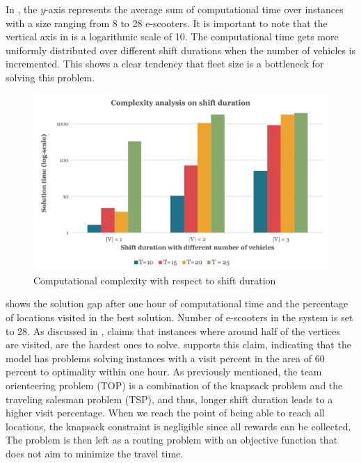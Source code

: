 In , the $y$-axis represents the average sum of computational time over instances with a size ranging from 8 to 28 e-scooters. It is important to note that the vertical axis in  is a logarithmic scale of 10. The computational time gets more uniformly distributed over different shift durations when the number of vehicles is incremented. This shows a clear tendency that fleet size is a bottleneck for solving this problem.
\\
\begin{figure}[H]
    \centering
    \includegraphics[width=0.8\columnwidth]{Images/Computational Study/sens_shift_dur.png}
    \caption{Computational complexity with respect to shift duration}
    \label{fig:size_solvable_sens_time}
\end{figure}
 shows the solution gap after one hour of computational time and the percentage of locations visited in the best solution. Number of e-scooters in the system is set to 28. As discussed in , \citet{vansteenwegen_iterated_2009} claims that instances where around half of the vertices are visited, are the hardest ones to solve.  supports this claim, indicating that the model has problems solving instances with a visit percent in the area of 60 percent to optimality within one hour. As previously mentioned, the team orienteering problem (TOP) is a combination of the knapsack problem and the traveling salesman problem (TSP), and thus, longer shift duration leads to a higher visit percentage. When we reach the point of being able to reach all locations, the knapsack constraint is negligible since all rewards can be collected. The problem is then left as a routing problem with an objective function that does not aim to minimize the travel time. 
\\

